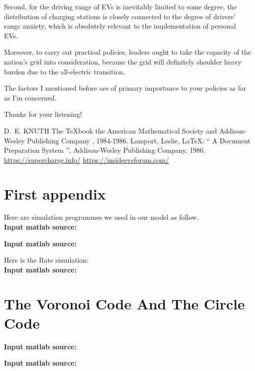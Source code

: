 \documentclass{mcmthesis}
\begin{document}
    Second, for the driving range of EVs is inevitably limited to some degree, the distribution of charging stations is closely connected to the degree of drivers' range anxiety, which is absolutely relevant to the implementation of personal EVs.
    
     Moreover, to carry out practical policies, leaders ought to take the capacity of the nation's grid into consideration, because the grid will definitely shoulder heavy burden due to the all-electric transition. 
     
     The factors I mentioned before are of primary importance to your policies as far as I'm concerned. 
     
     Thanks for your listening!


\newpage


\begin{thebibliography}{99}
 D.~E. KNUTH   The \TeX{}book  the American
Mathematical Society and Addison-Wesley
Publishing Company , 1984-1986.
Lamport, Leslie,  \LaTeX{}: `` A Document Preparation System '',
Addison-Wesley Publishing Company, 1986.
\url{https://supercharge.info/}
\url{https://insideevsforum.com/}
\end{thebibliography}

\begin{appendices}

\section{First appendix}

Here are simulation programmes we used in our model as follow.\\

\textbf{\textcolor[rgb]{0.98,0.00,0.00}{Input matlab source:}}


\textbf{\textcolor[rgb]{0.98,0.00,0.00}{Input matlab source:}}


Here is the Rate simulation:\\

\textbf{\textcolor[rgb]{0.98,0.00,0.00}{Input matlab source:}}


\section{The Voronoi Code And The Circle Code}

\textbf{\textcolor[rgb]{0.98,0.00,0.00}{Input matlab source:}}


\textbf{\textcolor[rgb]{0.98,0.00,0.00}{Input matlab source:}}



\end{appendices}
\end{document}
